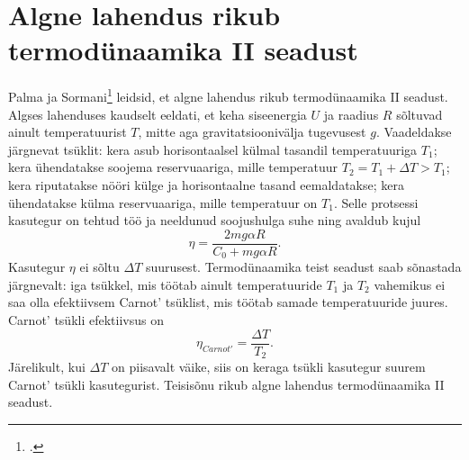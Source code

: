 \documentclass{trkut}%
\begin{document}
\section{Algne lahendus rikub termodünaamika II seadust} \label{rikub}

Palma ja Sormani\footcite[3-5]{palma15} leidsid, et algne lahendus rikub termodünaamika II seadust.
Algses lahenduses kaudselt eeldati, et keha siseenergia \(U\) ja raadius \(R\) sõltuvad ainult temperatuurist \(T\), mitte aga gravitatsioonivälja tugevusest \(g\).
Vaadeldakse järgnevat tsüklit: kera asub horisontaalsel külmal tasandil temperatuuriga \(T_1\); kera ühendatakse soojema reservuaariga, mille temperatuur \(T_2=T_1+\Delta T>T_1\); kera riputatakse nööri külge ja horisontaalne tasand eemaldatakse; kera ühendatakse külma reservuaariga, mille temperatuur on \(T_1\).
Selle protsessi kasutegur on tehtud töö ja neeldunud soojushulga suhe ning avaldub kujul \parencite[3-5]{palma15}
\begin{equation}
    \eta = \frac{2mg\alpha R}{C_0+mg\alpha R}.
\end{equation}
Kasutegur \(\eta\) ei sõltu \(\Delta T\) suurusest. Termodünaamika teist seadust saab sõnastada järgnevalt: iga tsükkel, mis töötab ainult temperatuuride \(T_1\) ja \(T_2\) vahemikus ei saa olla efektiivsem Carnot' tsüklist, mis töötab samade temperatuuride juures. Carnot' tsükli efektiivsus on \parencite[3-5]{palma15}
\begin{equation}
    \eta_{Carnot'} = \frac{\Delta T}{T_2}.
\end{equation}
Järelikult, kui \(\Delta T\) on piisavalt väike, siis on keraga tsükli kasutegur suurem Carnot' tsükli kasutegurist. Teisisõnu rikub algne lahendus termodünaamika II seadust.


%
\end{document}
